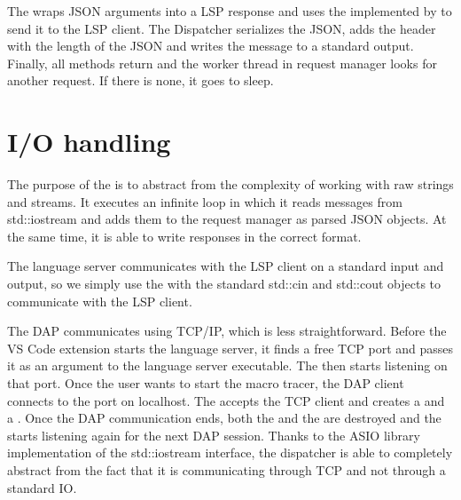 The  wraps JSON arguments into a LSP response and uses the  implemented by  to send it to the LSP client. The Dispatcher serializes the JSON, adds the header with the length of the JSON and writes the message to a standard output. Finally, all methods return and the worker thread in request manager looks for another request. If there is none, it goes to sleep.

\section{I/O handling}
The purpose of the  is to abstract from the complexity of working with raw strings and streams. It executes an infinite loop in which it reads messages from std::iostream and adds them to the request manager as parsed JSON objects. At the same time, it is able to write responses in the correct format.

The language server communicates with the LSP client on a standard input and output, so we simply use the  with the standard std::cin and std::cout objects to communicate with the LSP client.

The DAP communicates using TCP/IP, which is less straightforward. Before the VS Code extension starts the language server, it finds a free TCP port and passes it as an argument to the language server executable. The  then starts listening on that port. Once the user wants to start the macro tracer, the DAP client connects to the port on localhost. The  accepts the TCP client and creates a  and a . Once the DAP communication ends, both the  and the  are destroyed and the  starts listening again for the next DAP session. Thanks to the ASIO library implementation of the std::iostream interface, the dispatcher is able to completely abstract from the fact that it is communicating through TCP and not through a standard IO.


